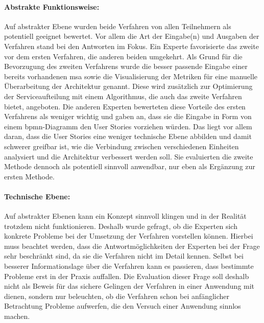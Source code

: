 \paragraph{Abstrakte Funktionsweise:} Auf abstrakter Ebene wurden beide Verfahren von allen Teilnehmern als potentiell geeignet bewertet.
Vor allem die Art der Eingabe(n) und Ausgaben der Verfahren stand bei den Antworten im Fokus.
Ein Experte favorisierte das zweite vor dem ersten Verfahren, die anderen beiden umgekehrt.
Als Grund für die Bevorzugung des  zweiten Verfahrens wurde die besser passende Eingabe einer bereits vorhandenen \gls{msa} sowie die Visualisierung der Metriken für eine manuelle Überarbeitung der Architektur genannt.
Diese wird zusätzlich zur Optimierung der Serviceaufteilung mit einem Algorithmus, die auch das zweite Verfahren bietet, angeboten.
Die anderen Experten bewerteten diese Vorteile des ersten Verfahrens als weniger wichtig und gaben an, dass sie die Eingabe in Form von einem \gls{bpmn}-Diagramm den User Stories vorziehen würden.
Das liegt vor allem daran, dass die User Stories eine weniger technische Ebene abbilden und damit schwerer greifbar ist, wie die Verbindung zwischen verschiedenen Einheiten analysiert und die Architektur verbessert werden soll.
Sie evaluierten die zweite Methode dennoch als potentiell sinnvoll anwendbar, nur eben als Ergänzung zur ersten Methode.

\paragraph{Technische Ebene:} Auf abstrakter Ebenen kann ein Konzept sinnvoll klingen und in der Realität trotzdem nicht funktionieren.
Deshalb wurde gefragt, ob die Experten sich konkrete Probleme bei der Umsetzung der Verfahren vorstellen können.
Hierbei muss beachtet werden, dass die Antwortmöglichkeiten der Experten bei der Frage sehr beschränkt sind, da sie die Verfahren nicht im Detail kennen.
Selbst bei besserer Informationslage über die Verfahren kann es passieren, dass bestimmte Probleme erst in der Praxis auffallen.
Die Evaluation dieser Frage soll deshalb nicht als Beweis für das sichere Gelingen der Verfahren in einer Anwendung mit \jf dienen, sondern nur beleuchten, ob die Verfahren schon bei anfänglicher Betrachtung Probleme aufwerfen, die den Versuch einer Anwendung sinnlos machen.

